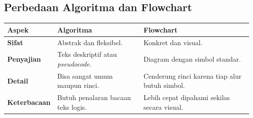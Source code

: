 \subsection{Perbedaan Algoritma dan Flowchart}
\begin{center}
    \begin{tabular}{l p{6cm} p{6cm}}
    \toprule
    \textbf{Aspek} & \textbf{Algoritma} & \textbf{Flowchart} \\ 
    \midrule
    \textbf{Sifat} & Abstrak dan fleksibel. & Konkret dan visual. \\ 
    \textbf{Penyajian} & Teks deskriptif atau \textit{pseudocode}. & Diagram dengan simbol standar. \\ 
    \textbf{Detail} & Bisa sangat umum maupun rinci. & Cenderung rinci karena tiap alur butuh simbol. \\ 
    \textbf{Keterbacaan} & Butuh penalaran bacaan teks logis. & Lebih cepat dipahami sekilas secara visual. \\ 
    \bottomrule
    \end{tabular}
\end{center}
